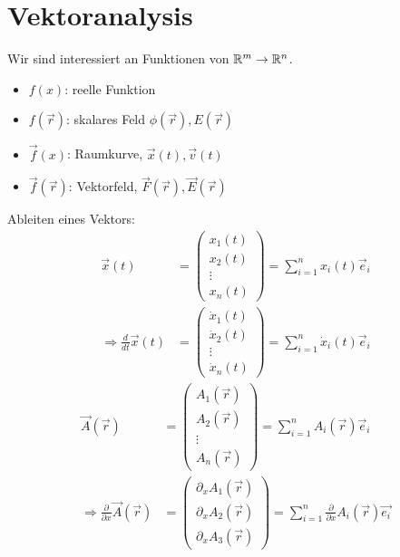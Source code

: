 \section{Vektoranalysis}
Wir sind interessiert an Funktionen von $\mathbb{R}^m\to\mathbb{R}^n$.
\begin{itemize}
 \item $f(x)$: reelle Funktion
 \item $f(\vec{r})$: skalares Feld $\phi(\vec{r}), E(\vec{r})$
 \item $\vec{f}(x)$: Raumkurve, $\vec{x}(t), \vec{v}(t)$
 \item $\vec{f}(\vec{r})$: Vektorfeld, $\vec{F}(\vec{r}), \vec{E}(\vec{r})$
\end{itemize}
Ableiten eines Vektors:
\begin{align*}
 \vec{x}(t) &= \begin{pmatrix}x_1(t)\\x_2(t)\\ \vdots\\x_n(t)\end{pmatrix} =
 \sum \limits_{i=1}^{n} x_i(t) \vec{e}_i\\ \Rightarrow \frac{d}{dt}\vec{x}(t) &= \begin{pmatrix} \dot{x}_1(t) \\  \dot{x}_2(t) \\ \vdots \\ \dot{x}_n(t) \end{pmatrix} = \sum \limits_{i=1}^{n} \dot{x}_i(t) \vec{e}_i
\end{align*}
\begin{align*}
 \vec{A}(\vec{r}) &= \begin{pmatrix}A_1(\vec{r})\\A_2(\vec{r})\\
 \vdots\\A_n(\vec{r})\end{pmatrix} = \sum \limits_{i=1}^{n}
 A_i(\vec{r})\vec{e}_i\\ \Rightarrow  \frac{\partial}{\partial x}\vec{A}(\vec{r}) &= \begin{pmatrix}\partial_x A_1(\vec{r})\\ \partial_x A_2(\vec{r})\\ \partial_x A_3(\vec{r}) \end{pmatrix} = \sum \limits_{i=1}^{n} \frac{\partial}{\partial x} A_i(\vec{r}) \vec{e_i}
\end{align*}

